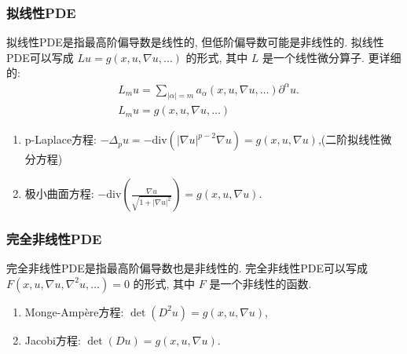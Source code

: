 \documentclass[11pt]{ctexart}[UTF8]
\begin{document}
\subsubsection*{拟线性PDE}
拟线性PDE是指最高阶偏导数是线性的, 但低阶偏导数可能是非线性的. 拟线性PDE可以写成 $Lu = g(x, u, \nabla u, \ldots)$ 的形式, 其中 $L$ 是一个线性微分算子.
更详细的:
\begin{equation*}
    \begin{aligned}
        &L_{m}u = \sum\limits_{|\alpha| = m} a_{\alpha}(x, u, \nabla u, \ldots) \partial^{\alpha} u.\\
        &L_{m}u = g(x, u, \nabla u, \ldots)
    \end{aligned}
\end{equation*}
\begin{example}
    \begin{enumerate}
        \item p-Laplace方程: $-\Delta_{p}u=-\mathrm{div}(|\nabla u|^{p-2} \nabla u) = g(x, u, \nabla u)$,(二阶拟线性微分方程)
        \item 极小曲面方程: $-\mathrm{div}\left( \frac{\nabla u}{\sqrt{1 + |\nabla u|^2}} \right) = g(x, u, \nabla u)$.
    \end{enumerate}
\end{example}

\subsubsection*{完全非线性PDE}
完全非线性PDE是指最高阶偏导数也是非线性的. 完全非线性PDE可以写成 $F(x, u, \nabla u, \nabla^2 u, \ldots) = 0$ 的形式, 其中 $F$ 是一个非线性的函数.
\begin{example}
    \begin{enumerate}
        \item Monge-Ampère方程: $\det (D^2 u) = g(x, u, \nabla u)$,
        \item Jacobi方程: $\det (D u) = g(x, u, \nabla u)$.
    \end{enumerate}
\end{example}
\end{document}
